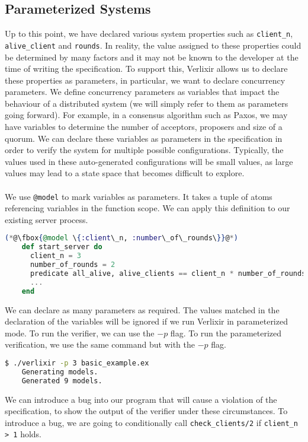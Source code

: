\subsection{Parameterized Systems}
Up to this point, we have declared various system properties such as \texttt{client\_n}, \texttt{alive\_client} and \texttt{rounds}. In reality, the value assigned to these properties could be determined by many factors and it may not be known to the developer at the time of writing the specification. To support this, Verlixir allows us to declare these properties as parameters, in particular, we want to declare concurrency parameters. We define concurrency parameters as variables that impact the behaviour of a distributed system (we will simply refer to them as parameters going forward). For example, in a consensus algorithm such as Paxos, we may have variables to determine the number of acceptors, proposers and size of a quorum. We can declare these variables as parameters in the specification in order to verify the system for multiple possible configurations. Typically, the values used in these auto-generated configurations will be small values, as large values may lead to a state space that becomes difficult to explore.
\\ \\
We use \texttt{@model} to mark variables as parameters. It takes a tuple of atoms referencing variables in the function scope. We can apply this definition to our existing server process.
\begin{lstlisting}[language=Elixir, xleftmargin=.3\linewidth, caption={Example of declaring concurrency parameters in specification.}]
    (*@\fbox{@model \{:client\_n, :number\_of\_rounds\}}@*)
    def start_server do
      client_n = 3
      number_of_rounds = 2
      predicate all_alive, alive_clients == client_n * number_of_rounds
      ...
    end
\end{lstlisting}
We can declare as many parameters as required. The values matched in the declaration of the variables will be ignored if we run Verlixir in parameterized mode. To run the verifier, we can use the $-p$ flag. To run the parameterized verification, we use the same command but with the $-p$ flag.
\begin{lstlisting}[language=bash, xleftmargin=.1\linewidth]
    $ ./verlixir -p 3 basic_example.ex 
    Generating models.
    Generated 9 models.
\end{lstlisting}
We can introduce a bug into our program that will cause a violation of the specification, to show the output of the verifier under these circumstances. To introduce a bug, we are going to conditionally call \texttt{check\_clients/2} if \texttt{client\_n > 1} holds.
